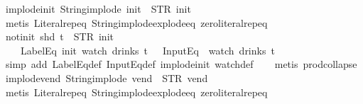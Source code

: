 \begin{isabellebody}
{\isafoldproof}%
%
\isadelimproof
\isanewline
%
\endisadelimproof
\isanewline
{}\isamarkupfalse%
\ implode{\isacharunderscore}init{\isacharcolon}\ {\isachardoublequoteopen}String{\isachardot}implode\ {\isacharprime}{\isacharprime}init{\isacharprime}{\isacharprime}\ {\isacharequal}\ STR\ {\isacharprime}{\isacharprime}init{\isacharprime}{\isacharprime}{\isachardoublequoteclose}\isanewline
%
\isadelimproof
\ \ %
\endisadelimproof
%
\isatagproof
{}\isamarkupfalse%
\ {\isacharparenleft}metis\ Literal{\isachardot}rep{\isacharunderscore}eq\ String{\isachardot}implode{\isacharunderscore}explode{\isacharunderscore}eq\ zero{\isacharunderscore}literal{\isachardot}rep{\isacharunderscore}eq{\isacharparenright}%
\endisatagproof
{\isafoldproof}%
%
\isadelimproof
\isanewline
%
\endisadelimproof
\isanewline
{}\isamarkupfalse%
\ not{\isacharunderscore}init{\isacharcolon}\ {\isachardoublequoteopen}shd\ t\ {\isasymnoteq}\ {\isacharparenleft}STR\ {\isacharprime}{\isacharprime}init{\isacharprime}{\isacharprime}{\isacharcomma}\ {\isacharbrackleft}{\isacharbrackright}{\isacharparenright}\ {\isasymLongrightarrow}\isanewline
\ \ \ \ LabelEq\ {\isacharprime}{\isacharprime}init{\isacharprime}{\isacharprime}\ {\isacharparenleft}watch\ drinks\ t{\isacharparenright}\ {\isasymLongrightarrow}\ {\isasymnot}\ InputEq\ {\isacharbrackleft}{\isacharbrackright}\ {\isacharparenleft}watch\ drinks\ t{\isacharparenright}{\isachardoublequoteclose}\isanewline
%
\isadelimproof
\ \ %
\endisadelimproof
%
\isatagproof
{}\isamarkupfalse%
\ {\isacharparenleft}simp\ add{\isacharcolon}\ LabelEq{\isacharunderscore}def\ InputEq{\isacharunderscore}def\ implode{\isacharunderscore}init\ watch{\isacharunderscore}def{\isacharparenright}\isanewline
\ \ \isamarkupfalse%
\ {\isacharparenleft}metis\ prod{\isachardot}collapse{\isacharparenright}%
\endisatagproof
{\isafoldproof}%
%
\isadelimproof
\isanewline
%
\endisadelimproof
\isanewline
{}\isamarkupfalse%
\ implode{\isacharunderscore}vend{\isacharcolon}\ {\isachardoublequoteopen}String{\isachardot}implode\ {\isacharprime}{\isacharprime}vend{\isacharprime}{\isacharprime}\ {\isacharequal}\ STR\ {\isacharprime}{\isacharprime}vend{\isacharprime}{\isacharprime}{\isachardoublequoteclose}\isanewline
%
\isadelimproof
\ \ %
\endisadelimproof
%
\isatagproof
{}\isamarkupfalse%
\ {\isacharparenleft}metis\ Literal{\isachardot}rep{\isacharunderscore}eq\ String{\isachardot}implode{\isacharunderscore}explode{\isacharunderscore}eq\ zero{\isacharunderscore}literal{\isachardot}rep{\isacharunderscore}eq{\isacharparenright}%

\end{isabellebody}
